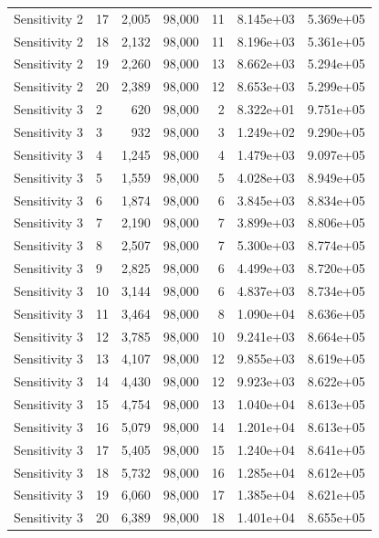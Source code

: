 \begin{xltabular}{\linewidth}{llrrrrr}
 Sensitivity 2 & 17 & 2,005 &  98,000 &   11 & 8.145e+03 & 5.369e+05 \\
 Sensitivity 2 & 18 & 2,132 &  98,000 &   11 & 8.196e+03 & 5.361e+05 \\
 Sensitivity 2 & 19 & 2,260 &  98,000 &   13 & 8.662e+03 & 5.294e+05 \\
 Sensitivity 2 & 20 & 2,389 &  98,000 &   12 & 8.653e+03 & 5.299e+05 \\
 Sensitivity 3 & 2 & 620 &  98,000 &   2 & 8.322e+01 & 9.751e+05 \\
 Sensitivity 3 & 3 & 932 &  98,000 &   3 & 1.249e+02 & 9.290e+05 \\
 Sensitivity 3 & 4 & 1,245 &  98,000 &   4 & 1.479e+03 & 9.097e+05 \\
 Sensitivity 3 & 5 & 1,559 &  98,000 &   5 & 4.028e+03 & 8.949e+05 \\
 Sensitivity 3 & 6 & 1,874 &  98,000 &   6 & 3.845e+03 & 8.834e+05 \\
 Sensitivity 3 & 7 & 2,190 &  98,000 &   7 & 3.899e+03 & 8.806e+05 \\
 Sensitivity 3 & 8 & 2,507 &  98,000 &   7 & 5.300e+03 & 8.774e+05 \\
 Sensitivity 3 & 9 & 2,825 &  98,000 &   6 & 4.499e+03 & 8.720e+05 \\
 Sensitivity 3 & 10 & 3,144 &  98,000 &   6 & 4.837e+03 & 8.734e+05 \\
 Sensitivity 3 & 11 & 3,464 &  98,000 &   8 & 1.090e+04 & 8.636e+05 \\
 Sensitivity 3 & 12 & 3,785 &  98,000 &   10 & 9.241e+03 & 8.664e+05 \\
 Sensitivity 3 & 13 & 4,107 &  98,000 &   12 & 9.855e+03 & 8.619e+05 \\
 Sensitivity 3 & 14 & 4,430 &  98,000 &   12 & 9.923e+03 & 8.622e+05 \\
 Sensitivity 3 & 15 & 4,754 &  98,000 &   13 & 1.040e+04 & 8.613e+05 \\
 Sensitivity 3 & 16 & 5,079 &  98,000 &   14 & 1.201e+04 & 8.613e+05 \\
 Sensitivity 3 & 17 & 5,405 &  98,000 &   15 & 1.240e+04 & 8.641e+05 \\
 Sensitivity 3 & 18 & 5,732 &  98,000 &   16 & 1.285e+04 & 8.612e+05 \\
 Sensitivity 3 & 19 & 6,060 &  98,000 &   17 & 1.385e+04 & 8.621e+05 \\
 Sensitivity 3 & 20 & 6,389 &  98,000 &   18 & 1.401e+04 & 8.655e+05 \\
 \bottomrule
\end{xltabular}\label{tab:aadh_h_state_selection}


